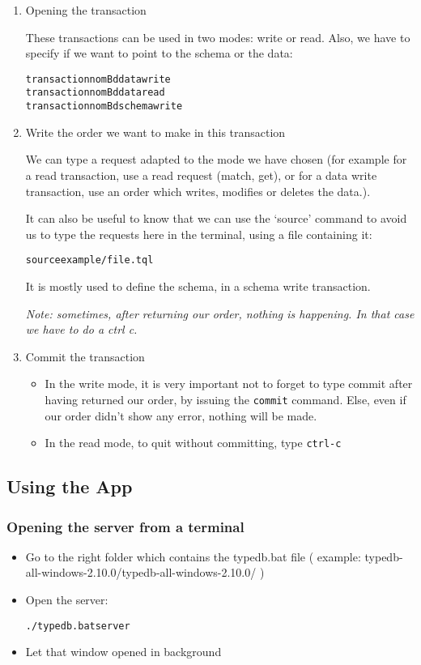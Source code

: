 \documentclass{article}
\begin{document}
\begin{enumerate}
\item Opening  the transaction

These transactions can be used in two modes: write or read. Also, we have to specify if we want to point to the schema or the data:

\begin{alltt}
transaction nomBd data write
transaction nomBd data read
transaction nomBd schema write
\end{alltt}       

\item Write the order we want to make in this transaction

We can type a request adapted to the mode we have chosen (for example for a read transaction, use a read request (match, get), or for a data write transaction, use an order which writes, modifies or deletes the data.).

It can also be useful to know that we can use the ‘source’ command to avoid us to type the requests here in the terminal, using a file containing it: 
\begin{alltt}source example/file.tql \end{alltt}
It is mostly used to define the schema, in a schema write transaction.

\emph{Note: sometimes, after returning our order, nothing is happening. In that case we have to do a ctrl c.}

\item Commit the transaction
\begin{itemize}
\item In the write mode, it is very important not to forget to type commit
  after having returned our order, by issuing the \texttt{commit}
  command. Else, even if our order didn’t show any error, nothing will be
  made.
\item In the read mode, to quit without committing, type \texttt{ctrl-c}
\end{itemize}

\end{enumerate}


\subsection{Using the App}

\subsubsection{Opening the server from a terminal}
\begin{itemize}
\item Go to the right folder which contains the typedb.bat file ( example: typedb-all-windows-2.10.0/typedb-all-windows-2.10.0/ )
\item Open the server: \begin{alltt}./typedb.bat server \end{alltt}
\item Let that window opened in background
\end{itemize}
\end{document}
